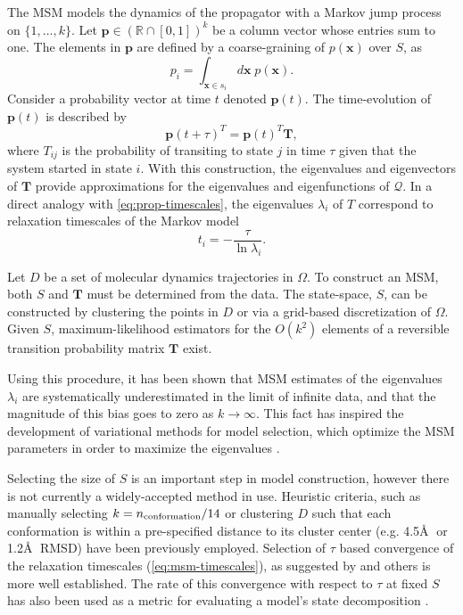 \documentclass[journal=jpcbfk, layout=traditional, manuscript=article]{achemso}
\begin{document}
The MSM models the dynamics of the propagator with a Markov jump process on $\{1, \ldots, k\}$. Let $\mathbf{p} \in (\mathbb{R} \cap [0,1])^k$ be a column vector whose entries sum to one. The elements in $\mathbf{p}$ are defined by a coarse-graining of $p(\mathbf{x})$ over $S$, as
\begin{equation}
\label{eq:coarse-grain-p}
p_i = \int_{\mathbf{x} \in s_i} d\mathbf{x}\; p(\mathbf{x}).
\end{equation} 
Consider a probability vector at time $t$ denoted $\mathbf{p}(t)$. The time-evolution of $\mathbf{p}(t)$ is described by
\begin{equation}
\mathbf{p}(t+\tau)^T = \mathbf{p}(t)^T \mathbf{T},
\end{equation}
where $T_{ij}$ is the probability of transiting to state $j$ in time $\tau$ given that the system started in state $i$. With this construction, the eigenvalues and eigenvectors of $\mathbf{T}$ provide approximations for the eigenvalues and eigenfunctions of $\mathcal{Q}$. In a direct analogy with \cref{eq:prop-timescales}, the eigenvalues $\lambda_i$ of $T$ correspond to relaxation timescales of the Markov model
\begin{equation}
\label{eq:msm-timescales}
t_i = -\frac{\tau}{\ln \lambda_i}.
\end{equation}


Let $D$ be a set of molecular dynamics trajectories in $\Omega$. To construct an MSM, both $S$ and $\mathbf{T}$ must be determined from the data. The state-space, $S$, can be constructed by clustering the points in $D$ or via a grid-based discretization of $\Omega$. Given $S$, maximum-likelihood estimators for the $O(k^2)$ elements of a reversible transition probability matrix $\mathbf{T}$ exist\cite{Beauchamp2011Msmbuilder2, Prinz2011Markov}.

Using this procedure, it has been shown that MSM estimates of the eigenvalues $\lambda_i$ are systematically underestimated in the limit of infinite data, and that the magnitude of this bias goes to zero as $k\rightarrow \infty$. This fact has inspired the development of variational methods for model selection, which optimize the MSM parameters in order to maximize the eigenvalues \cite{Noe2013Variational}.

Selecting the size of $S$ is an important step in model construction, however there is not currently a widely-accepted method in use. Heuristic criteria, such as manually selecting $k = n_\textnormal{conformation} / 14$ or clustering $D$ such that each conformation is within a pre-specified distance to its cluster center (e.g. 4.5\AA$\;$ or 1.2\AA $\;$ RMSD) have been previously employed\cite{Lane2011Markov, Bowman2012Equilibrium, Beauchamp2012Simple}. Selection of $\tau$ based convergence of the relaxation timescales (\cref{eq:msm-timescales}), as suggested by \citet{Swope2004Describing} and others is more well established. The rate of this convergence with respect to $\tau$ at fixed $S$ has also been used as a metric for evaluating a model's state decomposition \cite{someone}.
\end{document}
